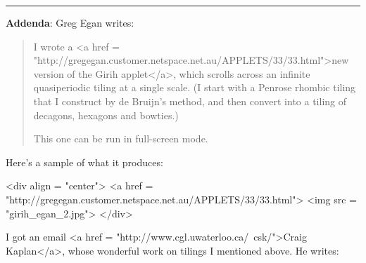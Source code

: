 \par\noindent\rule{\textwidth}{0.4pt}

\textbf{Addenda}: Greg Egan writes:

\begin{quote}

I wrote a <a href = "http://gregegan.customer.netspace.net.au/APPLETS/33/33.html">new version of the Girih applet</a>, which scrolls across an infinite 
quasiperiodic tiling at a single scale.  (I start with a Penrose rhombic 
tiling that I construct by de Bruijn's method, and then convert into a 
tiling of decagons, hexagons and bowties.)


This one can be run in full-screen mode.

\end{quote}

Here's a sample of what it produces:

<div align = "center">
<a href = "http://gregegan.customer.netspace.net.au/APPLETS/33/33.html">
<img src = "girih_egan_2.jpg">
</div>

I got an email 
<a href = "http://www.cgl.uwaterloo.ca/~csk/">Craig Kaplan</a>, whose 
wonderful work on tilings I mentioned above.  He writes:

